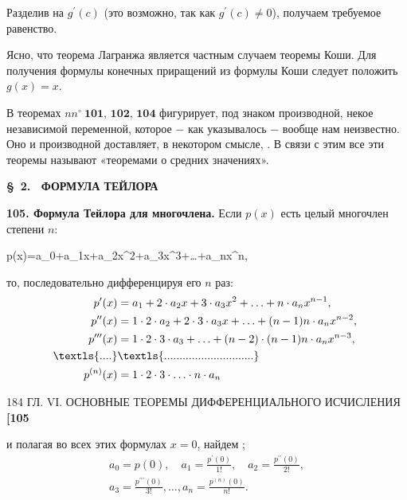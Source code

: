 \documentclass{book}
\begin{document}
Разделив на $g^{\prime}(c)$ (это возможно, так как $g^{\prime}(c) \neq 0$), получаем требуемое равенство.

Ясно, что теорема Лагранжа является частным случаем теоремы Коши. Для получения формулы конечных приращений из формулы Коши следует положить $g(x)=x$.

В теоремах $nn^{\circ} \ \textbf{101,\ 102,\ 104}$ фигурирует, под знаком производной, некое  независимой переменной, которое $-$ как указывалось $-$ вообще нам неизвестно. Оно и производной доставляет, в некотором смысле, . В связи с этим все эти теоремы называют «теоремами о средних значениях».

\smallskip
\begin{center}
	\textbf{\S \ 2. \ ФОРМУЛА ТЕЙЛОРА}
\end{center}

\textbf{105. Формула Тейлора для многочлена.} Если $p(x)$ есть целый многочлен степени $n$:
\begin{boldequation}
	\begin{gathered}
		p(x)=a_{0}+a_{1}x+a_{2}x^{2}+a_{3}x^{3}+\ldots+a_{n}x^{n},
	\end{gathered}
\end{boldequation}
то, последовательно дифференцируя его \textbf{$n$} раз:
\begin{align*}
	p^{\prime}(x)               & = a_{1}+2 \cdot a_{2} x+3 \cdot a_{3} x^{2}+\ldots+n \cdot a_{n} x^{n-1},                     \\
	p^{\prime \prime}(x)        & = 1 \cdot 2 \cdot a_{2}+2 \cdot 3 \cdot a_{3} x+\ldots+(n-1) n \cdot a_{n} x^{n-2} \text {, } \\
	p^{\prime \prime \prime}(x) & = 1 \cdot 2 \cdot 3 \cdot a_{3}+\ldots+(n-2) \cdot(n-1) n \cdot a_{n} x^{n-3} \text {, }      \\
	\textls{. . . . }           & \textls{. . . . . . . . . . . . . . . . . . . . . . . . . . . . . }                           \\
	p^{(n)}(x)                  & = 1 \cdot 2 \cdot 3 \cdot \ldots \cdot n \cdot a_{n}
\end{align*}

\newpage

\begin{center} 184
	\hspace{22pt}
	{\normalsize \textsection ГЛ. VI. ОСНОВНЫЕ ТЕОРЕМЫ ДИФФЕРЕНЦИАЛЬНОГО ИСЧИСЛЕНИЯ}
	\hspace{22pt}
	\textbf{[105}\\
\end{center}
\abovedisplayskip=15pt
\belowdisplayskip=15pt
\smallskip
\noindent и полагая во всех этих формулах $x=0$, найдем ;
$$
	\begin{gathered}
		a_{0}=p(0), \quad a_{1}=\frac{p^{\prime}(0)}{1 !}, \quad a_{2}=\frac{p^{\prime \prime}(0)}{2 !}, \\
		a_{3}=\frac{p^{\prime \prime \prime}(0)}{3 !}, \ldots, a_{n}=\frac{p^{(n)}(0)}{n !}.
	\end{gathered}
$$
\end{document}
